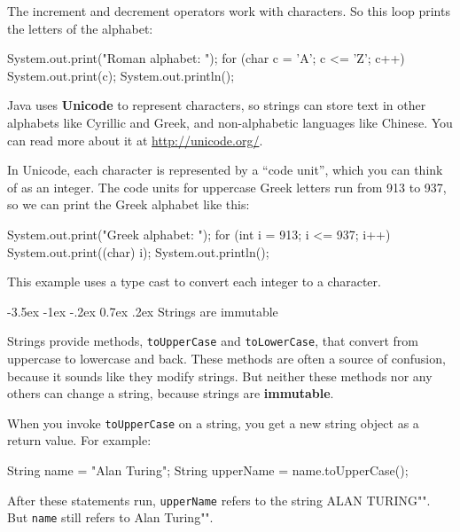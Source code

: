 \documentclass[12pt]{book}
\makeatletter
\theoremstyle{exercise}
\newcommand{\java}[1]{\verb"#1"}
\renewcommand{\section}{\@startsection{section}{1}{\z@}%
    {-3.5ex \@plus -1ex \@minus -.2ex}%
    {0.7ex \@plus.2ex}%
    {\normalfont\Large\bfseries}}
\newcommand{\java}[1]{\lstinline{#1}} %
\makeatother
\begin{document}
The increment and decrement operators work with characters.
So this loop prints the letters of the alphabet:

\begin{code}
    System.out.print("Roman alphabet: ");
    for (char c = 'A'; c <= 'Z'; c++) {
        System.out.print(c);
    }
    System.out.println();
\end{code}


Java uses {\bf Unicode} to represent characters, so strings can store text in other alphabets like Cyrillic and Greek, and non-alphabetic languages like Chinese.
You can read more about it at \url{http://unicode.org/}. 

In Unicode, each character is represented by a ``code unit'', which you can think of as an integer.
The code units for uppercase Greek letters run from 913 to 937, so we can print the Greek alphabet like this:

\begin{code}
    System.out.print("Greek alphabet: ");
    for (int i = 913; i <= 937; i++) {
        System.out.print((char) i);
    }
    System.out.println();
\end{code}

This example uses a type cast to convert each integer to a character.


\section{Strings are immutable}
\label{immutable}


Strings provide methods, \java{toUpperCase} and \java{toLowerCase}, that convert from uppercase to lowercase and back.
These methods are often a source of confusion, because it sounds like they modify strings.
But neither these methods nor any others can change a string, because strings are {\bf immutable}.

When you invoke \java{toUpperCase} on a string, you get a new string object as a return value.
For example:

\begin{code}
    String name = "Alan Turing";
    String upperName = name.toUpperCase();
\end{code}


After these statements run, \java{upperName} refers to the string \java{"ALAN TURING"}.
But \java{name} still refers to \java{"Alan Turing"}.
\end{document}
